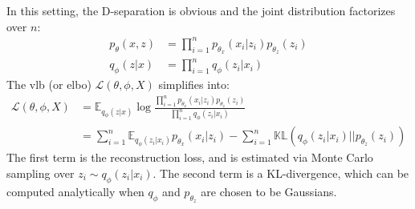 In this setting, the D-separation is obvious and the joint distribution factorizes over $n$:
\begin{align*}
    p_{\theta}(x,z) &= \prod_{i=1}^n p_{\theta_x}(x_i \vert z_i) p_{\theta_z}(z_i) \\
    q_{\phi}(z \vert x) &= \prod_{i=1}^n q_{\phi}(z_i \vert x_i)
\end{align*}
The \gls{vlb} (or \gls{elbo}) $\mathcal{L}(\theta, \phi, X)$ simplifies into:
\begin{align*}
    \mathcal{L}(\theta, \phi, X) &= \mathbb{E}_{q_{\phi}(z \vert x)} \log{\frac{\prod_{i=1}^n p_{\theta_x}(x_i \vert z_i) p_{\theta_z}(z_i)}{\prod_{i=1}^n q_{\phi}(z_i \vert x_i)}} \\
    &= \sum_{i=1}^n \mathbb{E}_{q_{\phi}(z_i \vert x_i)} p_{\theta_x}(x_i \vert z_i) - \sum_{i=1}^n \mathbb{KL}(q_{\phi}(z_i \vert x_i) \vert\vert p_{\theta_z}(z_i) )
\end{align*}
The first term is the reconstruction loss, and is estimated via Monte Carlo sampling over $z_i \sim q_{\phi}(z_i \vert x_i)$. The second term is a KL-divergence, which can be computed analytically when $q_\phi$ and $p_{\theta_z}$ are chosen to be Gaussians.









